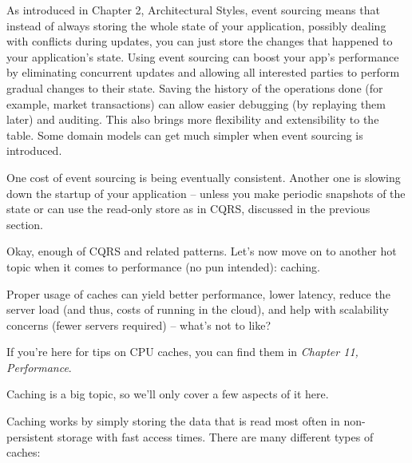 As introduced in Chapter 2, Architectural Styles, event sourcing means that instead of always storing the whole state of your application, possibly dealing with conflicts during updates, you can just store the changes that happened to your application's state. Using event sourcing can boost your app's performance by eliminating concurrent updates and allowing all interested parties to perform gradual changes to their state. Saving the history of the operations done (for example, market transactions) can allow easier debugging (by replaying them later) and auditing. This also brings more flexibility and extensibility to the table. Some domain models can get much simpler when event sourcing is introduced.

One cost of event sourcing is being eventually consistent. Another one is slowing down the startup of your application – unless you make periodic snapshots of the state or can use the read-only store as in CQRS, discussed in the previous section.

Okay, enough of CQRS and related patterns. Let's now move on to another hot topic when it comes to performance (no pun intended): caching.


Proper usage of caches can yield better performance, lower latency, reduce the server load (and thus, costs of running in the cloud), and help with scalability concerns (fewer servers required) – what's not to like?

\begin{tcolorbox}[colback=blue!5!white,colframe=blue!75!black, title=Note]
\hspace*{0.7cm}If you're here for tips on CPU caches, you can find them in \textit{Chapter 11, Performance}.
\end{tcolorbox}

Caching is a big topic, so we'll only cover a few aspects of it here.

Caching works by simply storing the data that is read most often in non-persistent storage with fast access times. There are many different types of caches: 


